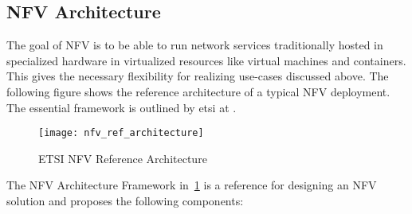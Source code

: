 \subsection{NFV Architecture}

The goal of NFV  is to be able to run network services traditionally hosted in specialized hardware in virtualized resources like virtual machines and containers. This gives the necessary flexibility for realizing use-cases discussed above.  The following figure shows the reference architecture of a typical NFV deployment. The essential framework is outlined by etsi at \cite{etsi02}.

\begin{figure}[h!]
	\centering
	\texttt{[image: nfv\_ref\_architecture]}
	\label{fig:figure5}
    \caption{ETSI NFV Reference Architecture \cite{etsi02}}
\end{figure}

The NFV Architecture Framework in~\ref{fig:figure5} is a reference for designing an NFV solution and proposes the following components:

